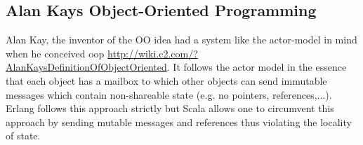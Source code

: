 \subsection{Alan Kays Object-Oriented Programming}
Alan Kay, the inventor of the OO idea had a system like the actor-model in mind when he conceived oop \url{http://wiki.c2.com/?AlanKaysDefinitionOfObjectOriented}. It follows the actor model in the essence that each object has a mailbox to which other objects can send immutable messages which contain non-shareable state (e.g. no pointers, references,...). Erlang follows this approach strictly but Scala allows one to circumvent this approach by sending mutable messages and references thus violating the locality of state.